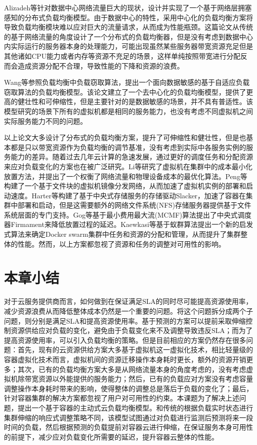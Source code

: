 Alizadeh等针对数据中心网络流量巨大的现状，设计并实现了一个基于网络层拥塞感知的分布式负载均衡模型\cite{alizadeh2014conga}。由于数据中心的特性，采用中心化的负载均衡方案将导致负载均衡模块难以应对巨大的流量请求，从而成为性能瓶颈。这篇论文从传统的基于网络流量的角度设计了一个分布式的负载均衡器，但是没有考虑到数据中心内实际运行的服务器本身的处理能力，可能出现虽然某些服务器带宽资源充足但是其他诸如CPU能力或者内存等资源不充足的场景，这样单纯按照带宽进行分配反而会造成资源分配不合理，导致性能的下降和资源的浪费。

Wang等参照负载均衡中负载窃取算法，提出一个面向数据敏感的基于自适应负载窃取算法的负载均衡模型\cite{wang2014optimizing}。该论文建立了一个去中心化的负载均衡模型，提供了更高的健壮性和可伸缩性，但是主要针对的是数据敏感的场景，并不具有普适性。该模型研究的场景下所有的虚拟机都是相同的服务能力，也没有考虑不同虚拟机之间实际服务能力不同的问题。

以上论文大多设计了分布式的负载均衡方案，提升了可伸缩性和健壮性，但是也基本都是只以带宽资源作为负载均衡的调节基准，没有考虑到实际中各服务实例的服务能力的差异。随着过去几年云计算的急速发展，通过更好的调度任务和分配资源来应对负载变化的方案也在被广泛研究。Li等研究了虚拟机在集群中的成本最小化放置方法，并提出了一个权衡了网络流量和物理设备成本的最优化算法\cite{li2014let}。Peng等构建了一个基于文件块的虚拟机镜像分发网络，从而加速了虚拟机实例的部署和启动速度\cite{peng2012vdn}。Harter等构建了基于中央式存储服务的存储驱动Slacker，加速了容器在集群中部署和启动，但是这需要额外的网络文件系统(NFS)存储服务器提供基于文件系统层面的专门支持\cite{harter2016slacker}。Gog等基于最小费用最大流(MCMF)算法提出了中央式调度器Firmament来降低放置过程的延迟\cite{gog2016firmament}。Kaewkasi等基于蚁群算法提出一个新的启发式算法来确定Docker swarm集群中任务和资源的分配和管理，从而提升了集群整体的性能\cite{kaewkasi2017improvement}。然而，以上方案都忽视了资源和任务的调整对可用性的影响。

\section{本章小结}
对于云服务提供商而言，如何做到在保证满足SLA的同时尽可能提高资源使用率，减少资源浪费从而降低整体成本仍然是一个重要的问题。将这个问题拆分成两个子问题，则分别是满足SLA和提高资源使用率。基于预测的方案可以提前采取伸缩控制资源供给应对负载的变化，避免由于负载变化来不及调整导致违反SLA；而为了提高资源使用率，可以引入负载均衡的策略。但是目前相应的方案仍然存在很多问题：首先，现有的云资源供给方案大多基于虚拟机这一虚拟化技术，相比轻量级的容器虚拟化技术而言，虚拟机间的资源迁移操作本身耗时更长，额外的资源开销更多；其次，已有的负载均衡方案大多是从网络流量本身的角度考虑的，没有考虑虚拟机除带宽资源以外能提供的服务能力；然后，已有的负载应对方案没有考虑容量调整操作本身耗时带来的影响，使得整体的调整总是落后于负载的变化了；最后，针对容器集群的解决方案都忽视了用户对可用性的约束。本课题为了解决上述问题，提出一个基于容器的主动式云负载均衡模型。和传统的根据负载实时状态进行集群伸缩的响应式调整策略不同，该模型试图通过对负载进行监测后预测将来一段时间的负载，然后根据预测的负载提前对容器云进行伸缩，在保证服务本身可用性的前提下，减少应对负载变化所需要的延迟，提升容器云整体的性能。
